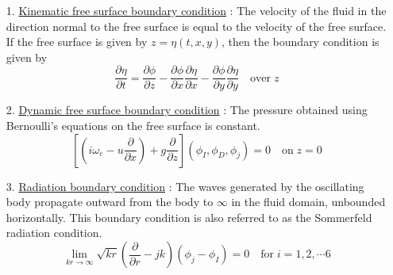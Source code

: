 \begin{itemize}
    \item[1.] \underline{Kinematic free surface boundary condition} : 
    The velocity of the fluid in the direction normal to the free surface is equal to the velocity of the free surface. If the free surface is given by $z = \eta(t, x, y)$, then the boundary condition is given by
    \begin{equation}
        \label{eq:kin_free_surface_cond}
        \frac{\partial \eta}{\partial t} = \frac{\partial \phi}{\partial z} - \frac{\partial \phi}{\partial x} \frac{\partial \eta}{\partial x} - \frac{\partial \phi}{\partial y}\frac{\partial \eta}{\partial y} \quad \text{over} \; z
    \end{equation}
    
    \item[2.] \underline{Dynamic free surface boundary condition} : 
    The pressure obtained using Bernoulli's equations on the free surface is constant.
    \begin{equation}
        \label{eq:dyn_free_surface_cond}
        \left[\left(i\omega_e - u\frac{\partial}{\partial x}\right) + g\frac{\partial}{\partial z}\right](\phi_I, \phi_D, \phi_j) = 0 \quad \text{on} \; z = 0
    \end{equation}
    
    \item[3.] \underline{Radiation boundary condition} :
    The waves generated by the oscillating body propagate outward from the body to $\infty$ in the fluid domain, unbounded horizontally. This boundary condition is also referred to as the Sommerfeld radiation condition.
    \begin{equation}
        \label{eq:sommerfel_rad_cond}
        \lim_{kr\rightarrow \infty}\sqrt{kr}\left(\frac{\partial}{\partial r} -jk\right)(\phi_j - \phi_I) = 0 \quad \text{for}\; i = 1, 2, \cdots 6
    \end{equation}
    

\end{itemize}

